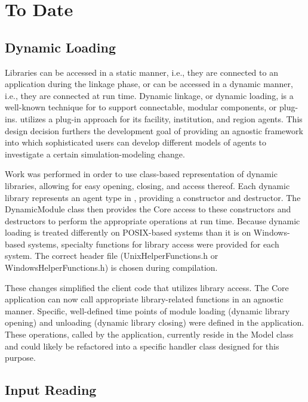 \section{\Cyclus To Date}

\subsection{Dynamic Loading}\label{sec:prev-dynamic}

Libraries can be accessed in a static manner, i.e., they are connected to an
application during the linkage phase, or can be accessed in a dynamic manner,
i.e., they are connected at run time. Dynamic linkage, or dynamic loading, is a
well-known technique for to support connectable, modular components, or
plug-ins. \Cyclus utilizes a plug-in approach for its facility, institution, and
region agents. This design decision furthers the \Cyclus development goal of
providing an agnostic framework into which sophisticated users can develop
different models of agents to investigate a certain simulation-modeling change.

Work was performed in order to use class-based representation of dynamic
libraries, allowing for easy opening, closing, and access thereof. Each dynamic
library represents an agent type in \Cyclus, providing a constructor and
destructor. The DynamicModule class then provides the \Cyclus Core access to
these constructors and destructors to perform the appropriate operations at run
time. Because dynamic loading is treated differently on POSIX-based systems than
it is on Windows-based systems, specialty functions for library access were
provided for each system. The correct header file (UnixHelperFunctions.h or
WindowsHelperFunctions.h) is chosen during compilation. 

These changes simplified the client code that utilizes library access. The
\Cyclus Core application can now call appropriate library-related functions in
an agnostic manner. Specific, well-defined time points of module loading
(dynamic library opening) and unloading (dynamic library closing) were defined
in the \Cyclus application. These operations, called by the application,
currently reside in the Model class and could likely be refactored into a
specific handler class designed for this purpose.

\subsection{Input Reading}

